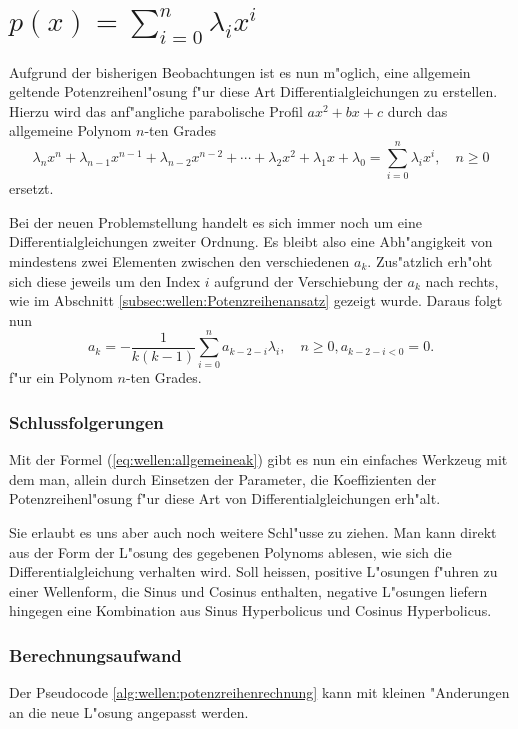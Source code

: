 \section{\texorpdfstring{$p(x) = \sum_{i=0}^{n}\lambda_ix^i$}{p(x) = summe i = 
0 bis n lambdai xi}}

Aufgrund der bisherigen Beobachtungen ist es nun m"oglich, eine 
allgemein geltende Potenzreihenl"osung f"ur diese Art Differentialgleichungen 
zu erstellen. Hierzu wird das anf"angliche parabolische Profil $ax^2 + bx + c$ 
durch das allgemeine Polynom $n$-ten Grades
\begin{equation*}
	\lambda_nx^n + \lambda_{n-1}x^{n-1} + \lambda_{n-2}x^{n-2} + \dotsb + 
	\lambda_2x^2 + \lambda_1x + \lambda_0 = \sum_{i=0}^{n}\lambda_ix^i, \quad n 
	\ge 0
\end{equation*}
ersetzt.

Bei der neuen Problemstellung handelt es sich immer noch um eine 
Differentialgleichungen zweiter Ordnung. Es bleibt also eine Abh"angigkeit von 
mindestens zwei Elementen zwischen den verschiedenen $a_k$. Zus"atzlich erh"oht 
sich diese jeweils um den Index $i$ aufgrund der Verschiebung der $a_k$ nach 
rechts, wie im Abschnitt \ref{subsec:wellen:Potenzreihenansatz} gezeigt wurde. 
Daraus folgt nun
\begin{equation}
	a_k = -\frac{1}{k(k-1)}\sum_{i=0}^{n}a_{k-2-i}\lambda_i, \quad n \ge 0, 
	a_{k-2-i < 0} =  0.
	\label{eq:wellen:allgemeineak}
\end{equation}
f"ur ein Polynom $n$-ten Grades.

\subsubsection{Schlussfolgerungen}

Mit der Formel (\ref{eq:wellen:allgemeineak}) gibt es nun ein einfaches 
Werkzeug mit dem man, allein durch Einsetzen der Parameter, die Koeffizienten 
der Potenzreihenl"osung f"ur diese Art von Differentialgleichungen erh"alt.

Sie erlaubt es uns aber auch noch weitere Schl"usse zu ziehen. Man kann direkt 
aus der Form der L"osung des gegebenen Polynoms ablesen, wie sich die 
Differentialgleichung verhalten wird. Soll heissen, positive L"osungen 
f"uhren zu einer Wellenform, die Sinus und Cosinus enthalten, negative 
L"osungen liefern hingegen eine Kombination aus Sinus Hyperbolicus und Cosinus 
Hyperbolicus.

\subsubsection{Berechnungsaufwand}
Der Pseudocode \ref{alg:wellen:potenzreihenrechnung} kann mit kleinen 
"Anderungen an die neue L"osung angepasst werden. 







